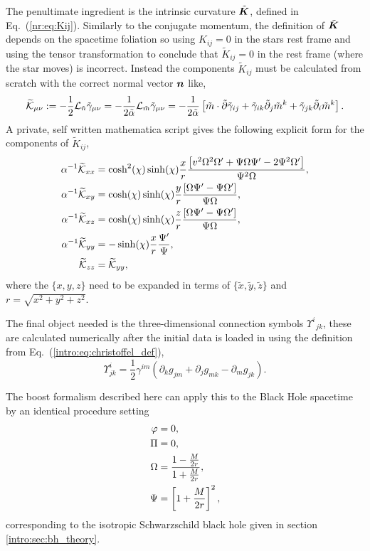 The penultimate ingredient is the intrinsic curvature $\tilde{\boldsymbol{K}}$, defined in Eq.~(\ref{nr:eq:Kij}). Similarly to the conjugate momentum, the definition of $\tilde{\boldsymbol{K}}$ depends on the spacetime foliation so using ${K}_{ij}=0$ in the stars rest frame and using the tensor transformation to conclude that $\tilde{K}_{ij}=0$ in the rest frame (where the star moves) is incorrect. Instead the components $\tilde{K}_{ij}$ must be calculated from scratch with the correct normal vector $\boldsymbol{n}$ like,
\begin{equation} \widetilde{\mathcal{K}}_{\mu\nu} := -\frac{1}{2}\mathcal{L}_{\tilde{n}}\tilde{\gamma}_{\mu\nu} =-\frac{1}{2\tilde{\alpha}}\mathcal{L}_{\tilde{m}}\tilde{\gamma}_{\mu\nu} = -\frac{1}{2\tilde{\alpha}}\left[ \tilde m \cdot \tilde{\partial}\tilde{\gamma}_{ij} +  \tilde{\gamma}_{ik}\tilde{\partial}_j \tilde{m}^k +\tilde{\gamma}_{jk}\tilde{\partial}_i \tilde{m}^k\right].\end{equation}
A private, self written mathematica script gives the following explicit form for the components of $\tilde{K}_{ij}$,
\begin{align}\alpha^{-1} \widetilde{\mathcal{K}}_{xx} &= \cosh^2(\chi)\sinh(\chi)\frac{x }{r}\frac{ \left[v^2 \Omega^2 \Omega'+\Psi \Omega \Psi'-2 \Psi^2 \Omega'\right]}{ \Psi^2 \Omega},\\
 \alpha^{-1} \widetilde{\mathcal{K}}_{xy} &= \cosh(\chi)\sinh(\chi)\frac{ y}{r}\frac{ \left[\Omega \Psi'- \Psi \Omega'\right]}{ \Psi \Omega },\\
 \alpha^{-1} \widetilde{\mathcal{K}}_{xz} &= \cosh(\chi)\sinh(\chi)\frac{ z}{r}\frac{  \left[\Omega \Psi'- \Psi \Omega'\right]}{ \Psi \Omega },\\
 \alpha^{-1} \widetilde{\mathcal{K}}_{yy} &= -\sinh(\chi)\frac{ x }{r}\frac{ \Psi'}{  \Psi },\\
\widetilde{\mathcal{K}}_{zz}&=\widetilde{\mathcal{K}}_{yy} ,\end{align}
where the $\{x,y,z\}$ need to be expanded in terms of $\{\tilde{x},  \tilde{y}, \tilde{z} \}$ and $r = \sqrt{x^2 + y^2 + z^2}$.

The final object needed is the three-dimensional connection symbols $\Upsilon^i_{\,\,\,jk}$, these are calculated numerically after the initial data is loaded in using the definition from Eq.~(\ref{intro:eq:christoffel_def}),
 \begin{equation}
\Upsilon^i_{jk} = \frac{1}{2}\gamma^{im}\left( \partial_k g_{jm} +  \partial_j g_{mk} -  \partial_m g_{jk} \right).
 \end{equation}

 The boost formalism described here can apply this to the Black Hole spacetime by an identical procedure setting 
\begin{align} 
\varphi&=0,\\
\Pi&=0,\\
\Omega &= \frac{1-\frac{M}{2r}}{1+\frac{M}{2r}}, \\
 \Psi &= \left[1+\frac{M}{2r}\right]^2,
 \end{align}
 corresponding to the isotropic Schwarzschild black hole given in section \ref{intro:sec:bh_theory}.
 
